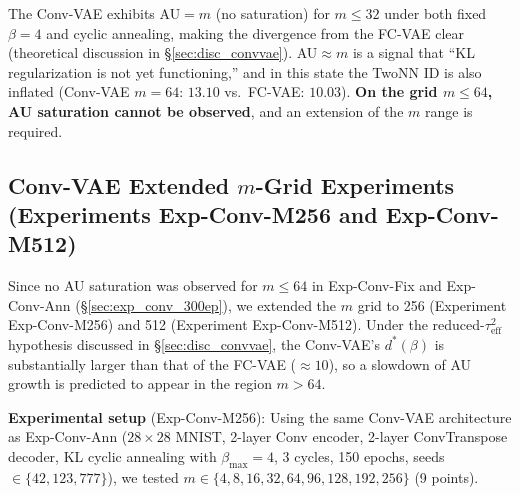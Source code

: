 \documentclass[make,article,submit,pdftex,moreauthors]{Definitions/mdpi}
\begin{document}
The Conv-VAE exhibits AU$=m$ (no saturation) for $m \leq 32$ under both fixed $\beta=4$ and cyclic annealing,
making the divergence from the FC-VAE clear (theoretical discussion in \S\ref{sec:disc_convvae}).
AU$\approx m$ is a signal that ``KL regularization is not yet functioning,'' and in this state the TwoNN ID
is also inflated (Conv-VAE $m=64$: $13.10$ vs.\ FC-VAE: $10.03$).
\textbf{On the grid $m \leq 64$, AU saturation cannot be observed}, and an extension of the $m$ range is required.

\subsection{Conv-VAE Extended $m$-Grid Experiments (Experiments Exp-Conv-M256 and Exp-Conv-M512)}\label{sec:exp_en}

Since no AU saturation was observed for $m \leq 64$ in Exp-Conv-Fix and Exp-Conv-Ann (\S\ref{sec:exp_conv_300ep}),
we extended the $m$ grid to 256 (Experiment Exp-Conv-M256) and 512 (Experiment Exp-Conv-M512).
Under the reduced-$\tau^2_\mathrm{eff}$ hypothesis discussed in \S\ref{sec:disc_convvae},
the Conv-VAE's $d^*(\beta)$ is substantially larger than that of the FC-VAE ($\approx 10$),
so a slowdown of AU growth is predicted to appear in the region $m>64$.

\textbf{Experimental setup} (Exp-Conv-M256):
Using the same Conv-VAE architecture as Exp-Conv-Ann ($28\times28$ MNIST, 2-layer Conv encoder,
2-layer ConvTranspose decoder, KL cyclic annealing with $\beta_\mathrm{max}=4$, 3 cycles,
150 epochs, seeds$\in\{42,123,777\}$),
we tested $m \in \{4, 8, 16, 32, 64, 96, 128, 192, 256\}$ (9 points).
\end{document}
